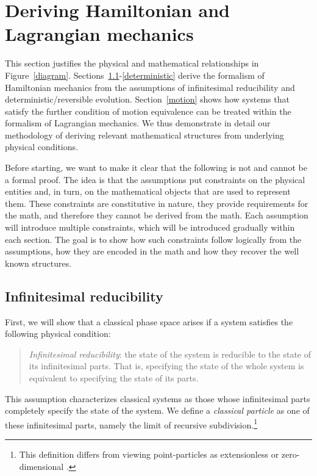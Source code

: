 \documentclass[12pt, english, twoside]{article} %
\newcommand\bs{\begin{singlespace}}
\newcommand\es{\end{singlespace}}
\begin{document}
\section{Deriving Hamiltonian and Lagrangian mechanics}
\label{derivation}

This section justifies the physical and mathematical relationships in Figure~\ref{diagram}.
Sections~\ref{infinitesimal}-\ref{deterministic} derive the formalism of Hamiltonian mechanics from the assumptions of infinitesimal reducibility and deterministic/reversible evolution. Section~\ref{motion} shows how systems that satisfy the further condition of motion equivalence can be treated within the formalism of Lagrangian mechanics. We thus demonstrate in detail our methodology of deriving  relevant mathematical structures from underlying physical conditions.

Before starting, we want to make it clear that the following is not and cannot be a formal proof. The idea is that the assumptions put constraints on the physical entities and, in turn, on the mathematical objects that are used to represent them. These constraints are constitutive in nature, they provide requirements for the math, and therefore they cannot be derived from the math. Each assumption will introduce multiple constraints, which will be introduced gradually within each section. The goal is to show how such constraints follow logically from the assumptions, how they are encoded in the math and how they recover the well known structures.

\subsection{Infinitesimal reducibility}
\label{infinitesimal}

First, we will show that a classical phase space arises if a system satisfies the following physical condition:


\begin{quotation}
\bs \noindent
\textit{Infinitesimal reducibility}: the state of the system is reducible to the state of its infinitesimal parts. That is, specifying the state of the whole system is equivalent to specifying the state of its parts.
\es
\end{quotation}


\noindent
This assumption characterizes classical systems as those whose infinitesimal parts completely specify the state of the system. We define a \textit{classical particle} as one of these infinitesimal parts, namely the limit of recursive subdivision.\footnote{This definition differs from viewing point-particles as extensionless \parencites[]{Butterfieldpoints} or zero-dimensional \parencites[]{Wilson}.}
\end{document}
